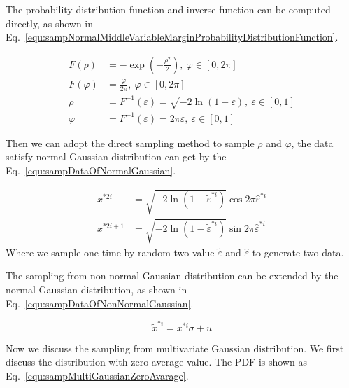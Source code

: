\documentclass[runningheads,openany]{xhlPaper}
\begin{document}
The probability distribution function and inverse function can be computed directly, as shown in Eq.~\ref{equ:sampNormalMiddleVariableMarginProbabilityDistributionFunction}.

\begin{equation}
\label{equ:sampNormalMiddleVariableMarginProbabilityDistributionFunction}
\begin{aligned}
F\left( \rho  \right) &=  - \exp \left( { - \frac{{{\rho ^2}}}{2}} \right),\ \varphi  \in \left[ {0,2\pi } \right]\\
F\left( \varphi  \right) &= \frac{\varphi }{{2\pi }},\ \varphi  \in \left[ {0,2\pi } \right]\\
\rho &= {F^{ - 1}}\left( \varepsilon  \right) = \sqrt { - 2\ln \left( { 1 - \varepsilon } \right)} ,\ \varepsilon  \in \left[ {0,1} \right]\\
\varphi &= {F^{ - 1}}\left( \varepsilon  \right) = 2\pi \varepsilon ,\ \varepsilon  \in \left[ {0,1} \right]
\end{aligned}
\end{equation}

Then we can adopt the direct sampling method to sample $\rho$ and $\varphi$, the data satisfy normal Gaussian distribution can get by the Eq.~\ref{equ:sampDataOfNormalGaussian}.

\begin{equation}
\label{equ:sampDataOfNormalGaussian}
\begin{aligned}
{x^{*2i}} &= \sqrt { - 2\ln \left( { 1 - {{\tilde \varepsilon }^{*i}}} \right)} \cos 2\pi {{\hat \varepsilon }^{*i}}\\
{x^{*2i + 1}} &= \sqrt { - 2\ln \left( { 1 - {{\tilde \varepsilon }^{*i}}} \right)} \sin 2\pi {{\hat \varepsilon }^{*i}}
\end{aligned}
\end{equation}
Where we sample one time by random two value $\tilde \varepsilon$ and $\hat \varepsilon$ to generate two data.

The sampling from non-normal Gaussian distribution can be extended by the normal Gaussian distribution, as shown in Eq.~\ref{equ:sampDataOfNonNormalGaussian}.

\begin{equation}
\label{equ:sampDataOfNonNormalGaussian}
{{\tilde x}^{*i}} = x^{*i}\sigma  + u
\end{equation}

Now we discuss the sampling from multivariate Gaussian distribution. We first discuss the distribution with zero average value. The PDF is shown as Eq.~\ref{equ:sampMultiGaussianZeroAvarage}.
\end{document}
